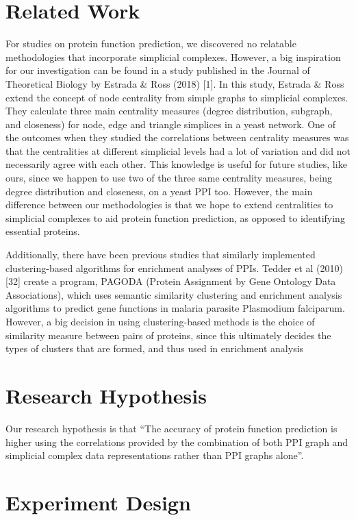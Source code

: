 \documentclass[9pt]{article}
\begin{document}
\section{Related Work}
For studies on protein function prediction, we discovered no relatable methodologies that incorporate simplicial complexes. However, a big inspiration for our investigation can be found in a study published in the Journal of Theoretical Biology by Estrada \& Ross (2018) [1]. In this study, Estrada \& Ross extend the concept of node centrality from simple graphs to simplicial complexes. They calculate three main centrality measures (degree distribution, subgraph, and closeness) for node, edge and triangle simplices in a yeast network. One of the outcomes when they studied the correlations between centrality measures was that the centralities at different simplicial levels had a lot of variation and did not necessarily agree with each other. This knowledge is useful for future studies, like ours, since we happen to use two of the three same centrality measures, being degree distribution and closeness, on a yeast PPI too. However, the main difference between our methodologies is that we hope to extend centralities to simplicial complexes to aid protein function prediction, as opposed to identifying essential proteins.
\par
Additionally, there have been previous studies that similarly implemented clustering-based algorithms for enrichment analyses of PPIs. Tedder et al (2010) [32] create a program, PAGODA (Protein Assignment by Gene Ontology Data Associations), which uses semantic similarity clustering and enrichment analysis algorithms to predict gene functions in malaria parasite Plasmodium falciparum. However, a big decision in using clustering-based methods is the choice of similarity measure between pairs of proteins, since this ultimately decides the types of clusters that are formed, and thus used in enrichment analysis

\section{Research Hypothesis}
Our research hypothesis is that “The accuracy of protein function prediction is higher using the correlations provided by the combination of both PPI graph and simplicial complex data representations rather than PPI graphs alone”. 

\section{Experiment Design}
\end{document}
